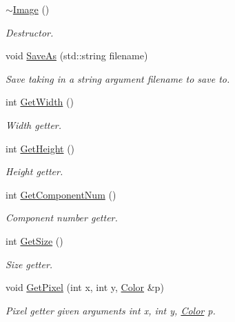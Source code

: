 \begin{DoxyCompactItemize}
\mbox{\label{classImage_a0294f63700543e11c0f0da85601c7ae5}} 
\hyperlink{classImage_a0294f63700543e11c0f0da85601c7ae5}{$\sim$\+Image} ()
\begin{DoxyCompactList}\small\item\em Destructor. \end{DoxyCompactList}\item 
\mbox{\label{classImage_a3a9b278005e0731a93fe1d5d2cff7104}} 
void \hyperlink{classImage_a3a9b278005e0731a93fe1d5d2cff7104}{Save\+As} (std\+::string filename)
\begin{DoxyCompactList}\small\item\em Save taking in a string argument filename to save to. \end{DoxyCompactList}\item 
int \hyperlink{classImage_a4ab80d76fd124fd9de9b4fca8ae16186}{Get\+Width} ()
\begin{DoxyCompactList}\small\item\em Width getter. \end{DoxyCompactList}\item 
int \hyperlink{classImage_a4d6de643ee334ff52c85da9a62d9297d}{Get\+Height} ()
\begin{DoxyCompactList}\small\item\em Height getter. \end{DoxyCompactList}\item 
int \hyperlink{classImage_a04e02c5aa54d26422bbaa777b08de4c9}{Get\+Component\+Num} ()
\begin{DoxyCompactList}\small\item\em Component number getter. \end{DoxyCompactList}\item 
int \hyperlink{classImage_ad9ce272b2befc075fa720ac25f673202}{Get\+Size} ()
\begin{DoxyCompactList}\small\item\em Size getter. \end{DoxyCompactList}\item 
\mbox{\label{classImage_a5b9ba06409ad38e86a035ad18d8204d2}} 
void \hyperlink{classImage_a5b9ba06409ad38e86a035ad18d8204d2}{Get\+Pixel} (int x, int y, \hyperlink{classColor}{Color} \&p)
\begin{DoxyCompactList}\small\item\em Pixel getter given arguments int x, int y, \hyperlink{classColor}{Color} p. \end{DoxyCompactList}\item 

\end{DoxyCompactItemize}
